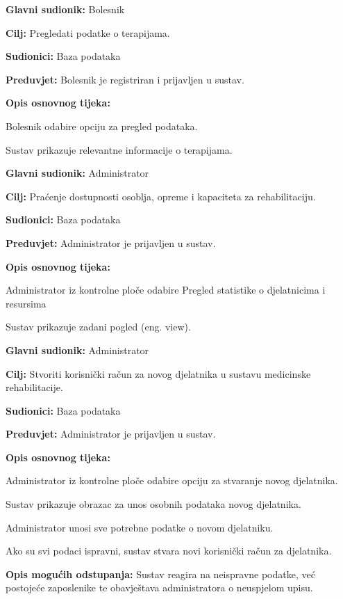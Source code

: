 	\item \textbf{Glavni sudionik:} Bolesnik
	\item \textbf{Cilj:} Pregledati podatke o terapijama.
	\item \textbf{Sudionici:} Baza podataka
	\item \textbf{Preduvjet:} Bolesnik je registriran i prijavljen u sustav.
	\item \textbf{Opis osnovnog tijeka:}
	\begin{packed_enum}
		\item Bolesnik odabire opciju za pregled podataka.
		\item Sustav prikazuje relevantne informacije o terapijama.
	\end{packed_enum}
\closeusecase


	\item \textbf{Glavni sudionik:} Administrator 
	\item \textbf{Cilj:} Praćenje dostupnosti osoblja, opreme i kapaciteta za rehabilitaciju.
	\item \textbf{Sudionici:} Baza podataka
	\item \textbf{Preduvjet:} Administrator je prijavljen u sustav.
	\item \textbf{Opis osnovnog tijeka:}
	\begin{packed_enum}
		\item Administrator iz kontrolne ploče odabire Pregled statistike o djelatnicima i resursima
		\item Sustav prikazuje zadani pogled (eng. view). 
	\end{packed_enum}
\closeusecase


	\item \textbf{Glavni sudionik:} Administrator
	\item \textbf{Cilj:} Stvoriti korisnički račun za novog djelatnika u sustavu medicinske rehabilitacije.
	\item \textbf{Sudionici:} Baza podataka
	\item \textbf{Preduvjet:} Administrator je prijavljen u sustav.
	\item \textbf{Opis osnovnog tijeka:}
	\begin{packed_enum}
		\item Administrator iz kontrolne ploče odabire opciju za stvaranje novog djelatnika.
		\item Sustav prikazuje obrazac za unos osobnih podataka novog djelatnika.
		\item Administrator unosi sve potrebne podatke o novom djelatniku.
		\item Ako su svi podaci ispravni, sustav stvara novi korisnički račun za djelatnika.
	\end{packed_enum}
	\item \textbf{Opis mogućih odstupanja:}
	Sustav reagira na neispravne podatke, već postojeće zaposlenike te obavještava administratora o neuspjelom upisu.
\closeusecase


